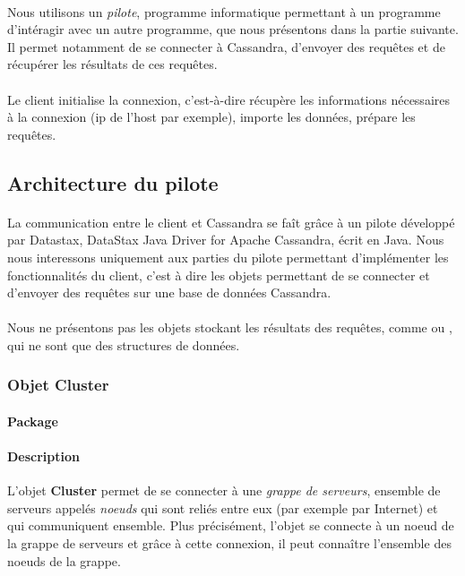 \documentclass[12pt]{article}
\begin{document}
\paragraph{} Nous utilisons un \textit{pilote}, programme informatique permettant à un programme d'intéragir avec un autre programme, que nous présentons dans la partie suivante.
Il permet notamment de se connecter à Cassandra, d'envoyer des requêtes et de récupérer les résultats de ces requêtes.

\paragraph{} Le client initialise la connexion, c'est-à-dire récupère les informations nécessaires à la connexion (ip de l'host par exemple), importe les données, prépare les requêtes.


\subsection{Architecture du pilote}

\paragraph{} La communication entre le client et Cassandra se faît grâce à un pilote développé par Datastax, DataStax Java Driver for Apache Cassandra, écrit en Java.
Nous nous interessons uniquement aux parties du pilote permettant d'implémenter les fonctionnalités du client, c'est à dire les objets permettant de se connecter et d'envoyer des requêtes sur une base de données Cassandra.

\paragraph{} Nous ne présentons pas les objets stockant les résultats des requêtes, comme  ou , qui ne sont que des structures de données. 

\subsubsection{Objet Cluster}

\paragraph{Package}  

\paragraph{Description} L'objet \textbf{Cluster} permet de se connecter à une \textit{grappe de serveurs}, ensemble de serveurs appelés \textit{noeuds} qui sont reliés entre eux (par exemple par Internet) et qui communiquent ensemble.
Plus précisément, l'objet se connecte à un noeud de la grappe de serveurs et grâce à cette connexion, il peut connaître l'ensemble des noeuds de la grappe.
\end{document}

